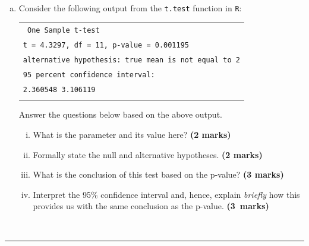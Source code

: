 \documentclass[12pt]{article}
\begin{document}
\begin{enumerate}[a)]
\begin{center}\noindent\rule{0.4\linewidth}{0.5pt}\end{center}
\item Consider the following output from the \texttt{t.test} function in \texttt{R}:\\[0.2cm]
    \begin{footnotesize}
\begin{tabular}{|l|}
\hline
\texttt{            One Sample t-test} \\
\texttt{t = 4.3297, df = 11, p-value = 0.001195}\\
\texttt{alternative hypothesis: true mean is not equal to 2}\\
\texttt{95 percent confidence interval:}\\
\texttt{2.360548 3.106119}\\
\hline
\multicolumn{1}{c}{}
\end{tabular}
\end{footnotesize}

Answer the questions below based on the above output.
    \begin{enumerate}[i)]\itemsep0.3cm
    \item What is the parameter and its value here? \hfill{\scriptsize \bf (2 marks)}
    \item Formally state the null and alternative hypotheses. \hfill{\scriptsize \bf (2 marks)}
    \item What is the conclusion of this test based on the p-value? \hfill{\scriptsize \bf (3 marks)}
    \item Interpret the 95\% confidence interval and, hence, explain \emph{briefly} how this provides us with the same conclusion as the p-value. \hfill{\mbox{\scriptsize \bf (3 marks)}}
    \end{enumerate}
\end{enumerate}
\quad\\[-0.3cm]
\noindent\rule{\linewidth}{1pt}

\newpage
\end{document}
